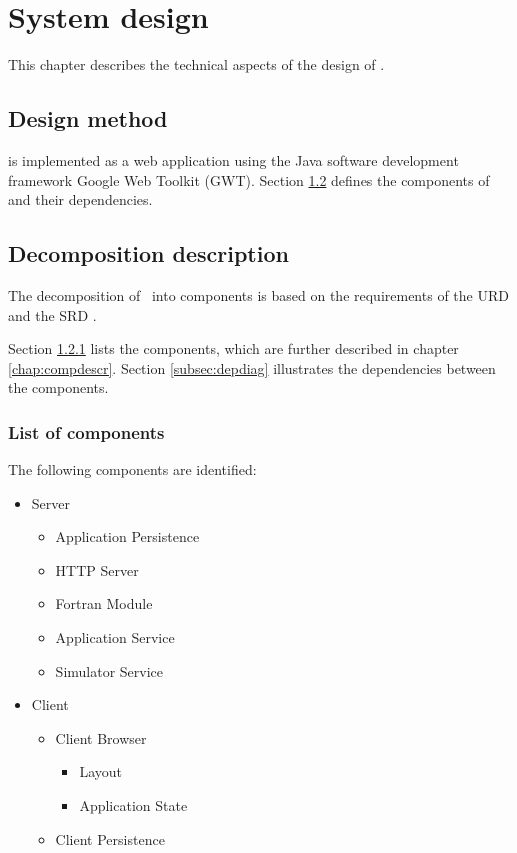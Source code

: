 \chapter{System design}
\label{chap:systdesign}
This chapter describes the technical aspects of the design of \projectname.

\section{Design method}
\projectname{} is implemented as a web application using the Java software development framework Google Web Toolkit (GWT). Section \ref{sec:decompdescr} defines the components of \projectname{} and their dependencies.


\section{Decomposition description}
\label{sec:decompdescr}
The decomposition of \projectname\ into components is based on the requirements of the URD \cite{urd} and the SRD \cite{srd}.

\fpstartparagraph{} Section \ref{subsec:complist} lists the components, which are further described in chapter \ref{chap:compdescr}. Section \ref{subsec:depdiag} illustrates the dependencies between the components.

\subsection{List of components}
\label{subsec:complist}
The following components are identiﬁed:

\begin{itemize}
\item Server
\begin{itemize}
\item Application Persistence
\item HTTP Server
\item Fortran Module
\item Application Service
\item Simulator Service
\end{itemize}
\item Client
\begin{itemize}
\item Client Browser
\begin{itemize}
\item Layout
\item Application State
\end{itemize}
\item Client Persistence
\end{itemize}
\end{itemize}

